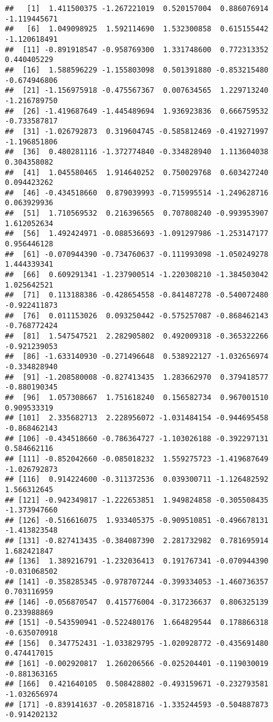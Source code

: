 \documentclass[
]{article}
\begin{document}
\begin{verbatim}
##   [1]  1.411500375 -1.267221019  0.520157004  0.886076914 -1.119445671
##   [6]  1.049098925  1.592114690  1.532300858  0.615155442 -1.120618491
##  [11] -0.891918547 -0.958769300  1.331748600  0.772313352  0.440405229
##  [16]  1.588596229 -1.155803098  0.501391880 -0.853215480 -0.674946806
##  [21] -1.156975918 -0.475567367  0.007634565  1.229713240 -1.216789750
##  [26] -1.419687649 -1.445489694  1.936923836  0.666759532 -0.733587817
##  [31] -1.026792873  0.319604745 -0.585812469 -0.419271997 -1.196851806
##  [36]  0.480281116 -1.372774840 -0.334828940  1.113604038  0.304358082
##  [41]  1.045580465  1.914640252  0.750029768  0.603427240  0.094423262
##  [46] -0.434518660  0.879039993 -0.715995514 -1.249628716  0.063929936
##  [51]  1.710569532  0.216396565  0.707808240 -0.993953907  1.612052634
##  [56]  1.492424971 -0.088536693 -1.091297986 -1.253147177  0.956446128
##  [61] -0.070944390 -0.734760637 -0.111993098 -1.050249278  1.444339341
##  [66]  0.609291341 -1.237900514 -1.220308210 -1.384503042  1.025642521
##  [71]  0.113188386 -0.428654558 -0.841487278 -0.540072480 -0.922411873
##  [76]  0.011153026  0.093250442 -0.575257087 -0.868462143 -0.768772424
##  [81]  1.547547521  2.282905802  0.492009318 -0.365322266 -0.921239053
##  [86] -1.633140930 -0.271496648  0.538922127 -1.032656974 -0.334828940
##  [91] -1.208580008 -0.827413435  1.283662970  0.379418577 -0.880190345
##  [96]  1.057308667  1.751618240  0.156582734  0.967001510  0.909533319
## [101]  2.335682713  2.228956072 -1.031484154 -0.944695458 -0.868462143
## [106] -0.434518660 -0.786364727 -1.103026188 -0.392297131  0.584662116
## [111] -0.852042660 -0.085018232  1.559275723 -1.419687649 -1.026792873
## [116]  0.914224600 -0.311372536  0.039300711 -1.126482592  1.566312645
## [121] -0.942349817 -1.222653851  1.949824858 -0.305508435 -1.373947660
## [126] -0.516616075  1.933405375 -0.909510851 -0.496678131 -1.413823548
## [131] -0.827413435 -0.384087390  2.281732982  0.781695914  1.682421847
## [136]  1.389216791 -1.232036413  0.191767341 -0.070944390 -0.031068502
## [141] -0.358285345 -0.978707244 -0.399334053 -1.460736357  0.703116959
## [146] -0.056870547  0.415776004 -0.317236637  0.806325139  0.233988869
## [151] -0.543590941 -0.522480176  1.664829544  0.178866318 -0.635070918
## [156]  0.347752431 -1.033829795 -1.020928772 -0.435691480  0.474417015
## [161] -0.002920817  1.260206566 -0.025204401 -0.119030019 -0.881363165
## [166]  0.421640105  0.508428802 -0.493159671 -0.232793581 -1.032656974
## [171] -0.839141637 -0.205818716 -1.335244593 -0.504887873 -0.914202132

\end{verbatim}
\end{document}
